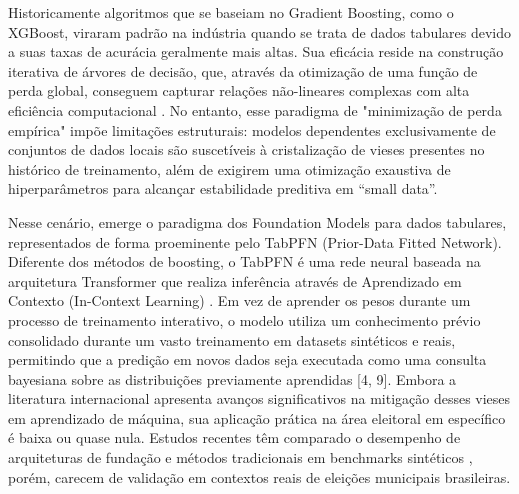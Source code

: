 \documentclass[12pt]{article}
\begin{document}
Historicamente algoritmos que se baseiam no Gradient Boosting, como o XGBoost, viraram padrão
na indústria quando se trata de dados tabulares devido a suas taxas de acurácia geralmente mais
altas. Sua eficácia reside na construção iterativa de árvores de decisão, que, através da
otimização de uma função de perda global, conseguem capturar relações não-lineares complexas
com alta eficiência computacional \cite{ravichandran:2020}. No entanto, esse paradigma de "minimização de perda empírica"
impõe limitações estruturais: modelos dependentes exclusivamente de conjuntos de dados locais são
suscetíveis à cristalização de vieses presentes no histórico de treinamento, além de exigirem uma
otimização exaustiva de hiperparâmetros para alcançar estabilidade preditiva em “small data”.

Nesse cenário, emerge o paradigma dos Foundation Models para dados tabulares, representados de forma
proeminente pelo TabPFN (Prior-Data Fitted Network). Diferente dos métodos de boosting, o TabPFN é
uma rede neural baseada na arquitetura Transformer que realiza inferência através de Aprendizado em
Contexto (In-Context Learning) \cite{garg:2025,qu:2025}. Em vez de aprender os pesos durante um processo de treinamento
interativo, o modelo utiliza um conhecimento prévio consolidado durante um vasto treinamento em datasets
sintéticos e reais, permitindo que a predição em novos dados seja executada como uma consulta bayesiana
sobre as distribuições previamente aprendidas [4, 9]. Embora a literatura internacional apresenta avanços
significativos na mitigação desses vieses em aprendizado de máquina, sua aplicação prática na área eleitoral
em específico é baixa ou quase nula. Estudos recentes têm comparado o desempenho de arquiteturas de fundação
e métodos tradicionais em benchmarks sintéticos \cite{robertson:2024,garg:2025}, porém, carecem de validação em contextos reais de
eleições municipais brasileiras. 
\end{document}
